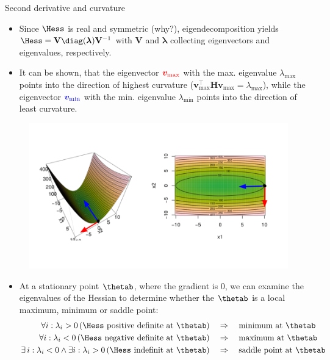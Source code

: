 \begin{vbframe}{Second derivative and curvature}
\begin{itemize}
  \item Since $\Hess$ is real and symmetric (why?), eigendecomposition yields
  $\Hess = \mathbf{V} \mathbf{\diag(\boldsymbol{\lambda})} \mathbf{V}^{-1}$
  with $\mathbf{V}$ and $\boldsymbol{\lambda}$ collecting eigenvectors and eigenvalues, respectively.
  \item It can be shown, that the eigenvector $\textcolor{red}{\bm{v}_{\text{max}}}$ with the max. eigenvalue $\lambda_{\text{max}}$ points into the direction of highest curvature ($\bm{v}_{\text{max}}^\top \bm{H} \bm{v}_{\text{max}} = \lambda_{\text{max}}$), while the eigenvector $\textcolor{blue}{\bm{v}_{\text{min}}}$ with the min. eigenvalue $\lambda_{\text{min}}$ points into the direction of least curvature. 
\end{itemize}

\vspace*{-0.5cm}

\begin{figure}
  \begin{center}
    \includegraphics[width=.7\textwidth]{figure/curvature2.png}
  \end{center}
\end{figure}

\framebreak 

\begin{itemize}
  \item At a stationary point $\thetab$, where the gradient is 0, we can examine the eigenvalues of the Hessian to determine whether the $\thetab$ is a local maximum, minimum or saddle point: 
  \vspace{-0.3cm}
  \begin{align*} 
  \quad\forall i: \lambda_i > 0  \, (\Hess \text{ positive definite at $\thetab$}) &\quad\Rightarrow\quad \text{minimum at $\thetab$} \\
  \quad\forall i: \lambda_i < 0 \, (\Hess \text{ negative definite at $\thetab$}) &\quad\Rightarrow\quad \text{maximum at $\thetab$}\\
  \exists\, i: \lambda_i < 0 \land  \exists i: \lambda_i > 0  \,(\Hess \text{ indefinit at $\thetab$}) &\quad\Rightarrow\quad \mbox{saddle point at $\thetab$}
  \end{align*}
\end{itemize}
   \begin{figure}
 \captionsetup{font=footnotesize,labelfont=footnotesize, labelfont = bf}


\end{figure}
\end{vbframe}
